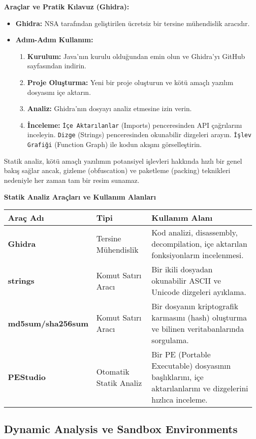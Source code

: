 \textbf{Araçlar ve Pratik Kılavuz (Ghidra):}
\begin{itemize}
    \item \textbf{Ghidra:} NSA tarafından geliştirilen ücretsiz bir tersine mühendislik aracıdır.
    \item \textbf{Adım-Adım Kullanım:}
    \begin{enumerate}
        \item \textbf{Kurulum:} Java'nın kurulu olduğundan emin olun ve Ghidra'yı GitHub sayfasından indirin.
        \item \textbf{Proje Oluşturma:} Yeni bir proje oluşturun ve kötü amaçlı yazılım dosyasını içe aktarın.
        \item \textbf{Analiz:} Ghidra'nın dosyayı analiz etmesine izin verin.
        \item \textbf{İnceleme:} \texttt{İçe Aktarılanlar} (Imports) penceresinden API çağrılarını inceleyin. \texttt{Dizge} (Strings) penceresinden okunabilir dizgeleri arayın. \texttt{İşlev Grafiği} (Function Graph) ile kodun akışını görselleştirin.
    \end{enumerate}
\end{itemize}

Statik analiz, kötü amaçlı yazılımın potansiyel işlevleri hakkında hızlı bir genel bakış sağlar ancak, gizleme (obfuscation) ve paketleme (packing) teknikleri nedeniyle her zaman tam bir resim sunamaz.

\textbf{Statik Analiz Araçları ve Kullanım Alanları}

\begin{tabularx}{\textwidth}{|l|X|X|}
\hline
\textbf{Araç Adı} & \textbf{Tipi} & \textbf{Kullanım Alanı} \\
\hline
\textbf{Ghidra} & Tersine Mühendislik & Kod analizi, disassembly, decompilation, içe aktarılan fonksiyonların incelenmesi. \\
\hline
\textbf{strings} & Komut Satırı Aracı & Bir ikili dosyadan okunabilir ASCII ve Unicode dizgeleri ayıklama. \\
\hline
\textbf{md5sum/sha256sum} & Komut Satırı Aracı & Bir dosyanın kriptografik karmasını (hash) oluşturma ve bilinen veritabanlarında sorgulama. \\
\hline
\textbf{PEStudio} & Otomatik Statik Analiz & Bir PE (Portable Executable) dosyasının başlıklarını, içe aktarılanlarını ve dizgelerini hızlıca inceleme. \\
\hline
\end{tabularx}

\subsection{Dynamic Analysis ve Sandbox Environments}

